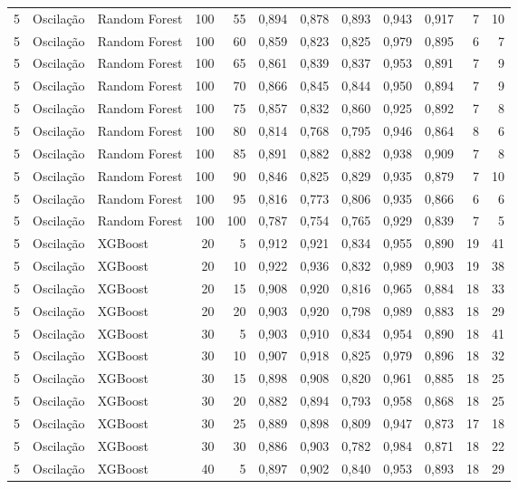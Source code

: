 \begin{longtable}{@{}rllrrrrrrrrr@{}}
5 & Oscilação & Random Forest & 100 & 55 & 0,894 & 0,878 & 0,893 & 0,943 & 0,917 & 7 & 10 \\
5 & Oscilação & Random Forest & 100 & 60 & 0,859 & 0,823 & 0,825 & 0,979 & 0,895 & 6 & 7 \\
5 & Oscilação & Random Forest & 100 & 65 & 0,861 & 0,839 & 0,837 & 0,953 & 0,891 & 7 & 9 \\
5 & Oscilação & Random Forest & 100 & 70 & 0,866 & 0,845 & 0,844 & 0,950 & 0,894 & 7 & 9 \\
5 & Oscilação & Random Forest & 100 & 75 & 0,857 & 0,832 & 0,860 & 0,925 & 0,892 & 7 & 8 \\
5 & Oscilação & Random Forest & 100 & 80 & 0,814 & 0,768 & 0,795 & 0,946 & 0,864 & 8 & 6 \\
5 & Oscilação & Random Forest & 100 & 85 & 0,891 & 0,882 & 0,882 & 0,938 & 0,909 & 7 & 8 \\
5 & Oscilação & Random Forest & 100 & 90 & 0,846 & 0,825 & 0,829 & 0,935 & 0,879 & 7 & 10 \\
5 & Oscilação & Random Forest & 100 & 95 & 0,816 & 0,773 & 0,806 & 0,935 & 0,866 & 6 & 6 \\
5 & Oscilação & Random Forest & 100 & 100 & 0,787 & 0,754 & 0,765 & 0,929 & 0,839 & 7 & 5 \\
5 & Oscilação & XGBoost & 20 & 5 & 0,912 & 0,921 & 0,834 & 0,955 & 0,890 & 19 & 41 \\
5 & Oscilação & XGBoost & 20 & 10 & 0,922 & 0,936 & 0,832 & 0,989 & 0,903 & 19 & 38 \\
5 & Oscilação & XGBoost & 20 & 15 & 0,908 & 0,920 & 0,816 & 0,965 & 0,884 & 18 & 33 \\
5 & Oscilação & XGBoost & 20 & 20 & 0,903 & 0,920 & 0,798 & 0,989 & 0,883 & 18 & 29 \\
5 & Oscilação & XGBoost & 30 & 5 & 0,903 & 0,910 & 0,834 & 0,954 & 0,890 & 18 & 41 \\
5 & Oscilação & XGBoost & 30 & 10 & 0,907 & 0,918 & 0,825 & 0,979 & 0,896 & 18 & 32 \\
5 & Oscilação & XGBoost & 30 & 15 & 0,898 & 0,908 & 0,820 & 0,961 & 0,885 & 18 & 25 \\
5 & Oscilação & XGBoost & 30 & 20 & 0,882 & 0,894 & 0,793 & 0,958 & 0,868 & 18 & 25 \\
5 & Oscilação & XGBoost & 30 & 25 & 0,889 & 0,898 & 0,809 & 0,947 & 0,873 & 17 & 18 \\
5 & Oscilação & XGBoost & 30 & 30 & 0,886 & 0,903 & 0,782 & 0,984 & 0,871 & 18 & 22 \\
5 & Oscilação & XGBoost & 40 & 5 & 0,897 & 0,902 & 0,840 & 0,953 & 0,893 & 18 & 29 \\

\end{longtable}
